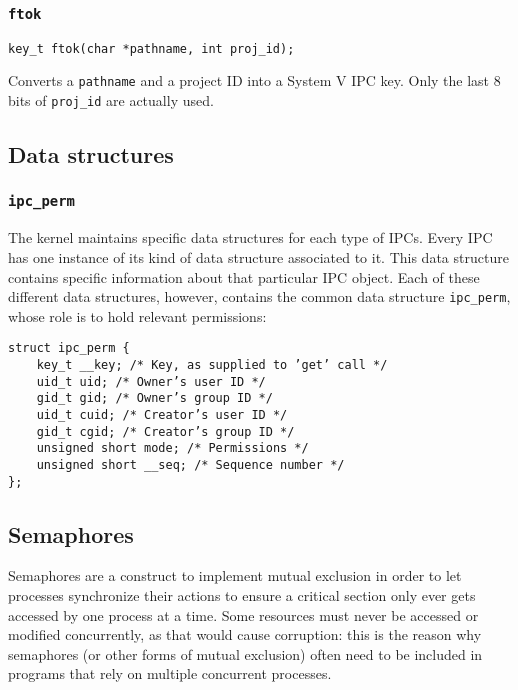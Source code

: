 \documentclass{article}
\begin{document}
\subsubsection{\texttt{ftok}}

\begin{verbatim}
key_t ftok(char *pathname, int proj_id);
\end{verbatim}

Converts a \texttt{pathname} and a project ID into a System V IPC key. Only the last 8 bits of \texttt{proj\_id} are actually used.

\subsection{Data structures}

\subsubsection{\texttt{ipc\_perm}}

The kernel maintains specific data structures for each type of IPCs. Every IPC has one instance of its kind of data structure associated to it. This data structure contains specific information about that particular IPC object. Each of these different data structures, however, contains the common data structure \texttt{ipc\_perm}, whose role is to hold relevant permissions:

\begin{verbatim}
struct ipc_perm {
    key_t __key; /* Key, as supplied to ’get’ call */
    uid_t uid; /* Owner’s user ID */
    gid_t gid; /* Owner’s group ID */
    uid_t cuid; /* Creator’s user ID */
    gid_t cgid; /* Creator’s group ID */
    unsigned short mode; /* Permissions */
    unsigned short __seq; /* Sequence number */
};
\end{verbatim}

\subsection{Semaphores}

Semaphores are a construct to implement mutual exclusion in order to let processes synchronize their actions to ensure a critical section only ever gets accessed by one process at a time. Some resources must never be accessed or modified concurrently, as that would cause corruption: this is the reason why semaphores (or other forms of mutual exclusion) often need to be included in programs that rely on multiple concurrent processes.
\end{document}
